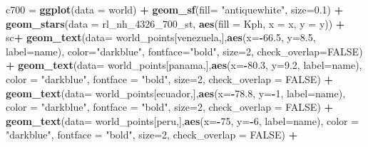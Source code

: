 \documentclass[12pt,twoside]{reedthesis}
\newenvironment{Shaded}{\begin{snugshade}}{\end{snugshade}}
\newcommand{\DataTypeTok}[1]{\textcolor[rgb]{0.13,0.29,0.53}{#1}}
\newcommand{\DecValTok}[1]{\textcolor[rgb]{0.00,0.00,0.81}{#1}}
\newcommand{\FloatTok}[1]{\textcolor[rgb]{0.00,0.00,0.81}{#1}}
\newcommand{\KeywordTok}[1]{\textcolor[rgb]{0.13,0.29,0.53}{\textbf{#1}}}
\newcommand{\NormalTok}[1]{#1}
\newcommand{\OperatorTok}[1]{\textcolor[rgb]{0.81,0.36,0.00}{\textbf{#1}}}
\newcommand{\OtherTok}[1]{\textcolor[rgb]{0.56,0.35,0.01}{#1}}
\newcommand{\StringTok}[1]{\textcolor[rgb]{0.31,0.60,0.02}{#1}}
\begin{document}
\begin{Shaded}
\begin{Highlighting}[]
\NormalTok{c700 =}\StringTok{ }\KeywordTok{ggplot}\NormalTok{(}\DataTypeTok{data =}\NormalTok{ world) }\OperatorTok{+}\StringTok{ }
\StringTok{  }\KeywordTok{geom_sf}\NormalTok{(}\DataTypeTok{fill=} \StringTok{"antiquewhite"}\NormalTok{, }\DataTypeTok{size=}\FloatTok{0.1}\NormalTok{) }\OperatorTok{+}\StringTok{ }
\StringTok{  }\KeywordTok{geom_stars}\NormalTok{(}\DataTypeTok{data =}\NormalTok{ rl_nh_}\DecValTok{4326}\NormalTok{_}\DecValTok{700}\NormalTok{_st, }\KeywordTok{aes}\NormalTok{(}\DataTypeTok{fill =}\NormalTok{ Kph, }\DataTypeTok{x =}\NormalTok{ x, }\DataTypeTok{y =}\NormalTok{ y)) }\OperatorTok{+}\StringTok{ }
\StringTok{  }\NormalTok{sc}\OperatorTok{+}
\StringTok{  }\KeywordTok{geom_text}\NormalTok{(}\DataTypeTok{data=}\NormalTok{ world_points[venezuela,],}\KeywordTok{aes}\NormalTok{(}\DataTypeTok{x=}\OperatorTok{-}\FloatTok{66.5}\NormalTok{, }\DataTypeTok{y=}\FloatTok{8.5}\NormalTok{, }\DataTypeTok{label=}\NormalTok{name), }\DataTypeTok{color=}\StringTok{"darkblue"}\NormalTok{, }\DataTypeTok{fontface=}\StringTok{"bold"}\NormalTok{, }\DataTypeTok{size=}\DecValTok{2}\NormalTok{, }\DataTypeTok{check_overlap=}\OtherTok{FALSE}\NormalTok{) }\OperatorTok{+}
\StringTok{  }\KeywordTok{geom_text}\NormalTok{(}\DataTypeTok{data=}\NormalTok{ world_points[panama,],}\KeywordTok{aes}\NormalTok{(}\DataTypeTok{x=}\OperatorTok{-}\FloatTok{80.3}\NormalTok{, }\DataTypeTok{y=}\FloatTok{9.2}\NormalTok{, }\DataTypeTok{label=}\NormalTok{name), }\DataTypeTok{color =} \StringTok{"darkblue"}\NormalTok{, }\DataTypeTok{fontface =} \StringTok{"bold"}\NormalTok{, }\DataTypeTok{size=}\DecValTok{2}\NormalTok{, }\DataTypeTok{check_overlap =} \OtherTok{FALSE}\NormalTok{) }\OperatorTok{+}\StringTok{ }
\StringTok{  }\KeywordTok{geom_text}\NormalTok{(}\DataTypeTok{data=}\NormalTok{ world_points[ecuador,],}\KeywordTok{aes}\NormalTok{(}\DataTypeTok{x=}\OperatorTok{-}\FloatTok{78.8}\NormalTok{, }\DataTypeTok{y=}\OperatorTok{-}\DecValTok{1}\NormalTok{, }\DataTypeTok{label=}\NormalTok{name), }\DataTypeTok{color =} \StringTok{"darkblue"}\NormalTok{, }\DataTypeTok{fontface =} \StringTok{"bold"}\NormalTok{, }\DataTypeTok{size=}\DecValTok{2}\NormalTok{, }\DataTypeTok{check_overlap =} \OtherTok{FALSE}\NormalTok{) }\OperatorTok{+}
\StringTok{  }\KeywordTok{geom_text}\NormalTok{(}\DataTypeTok{data=}\NormalTok{ world_points[peru,],}\KeywordTok{aes}\NormalTok{(}\DataTypeTok{x=}\OperatorTok{-}\DecValTok{75}\NormalTok{, }\DataTypeTok{y=}\OperatorTok{-}\DecValTok{6}\NormalTok{, }\DataTypeTok{label=}\NormalTok{name), }\DataTypeTok{color =} \StringTok{"darkblue"}\NormalTok{, }\DataTypeTok{fontface =} \StringTok{"bold"}\NormalTok{, }\DataTypeTok{size=}\DecValTok{2}\NormalTok{, }\DataTypeTok{check_overlap =} \OtherTok{FALSE}\NormalTok{) }\OperatorTok{+}

\end{Highlighting}
\end{Shaded}
\end{document}
